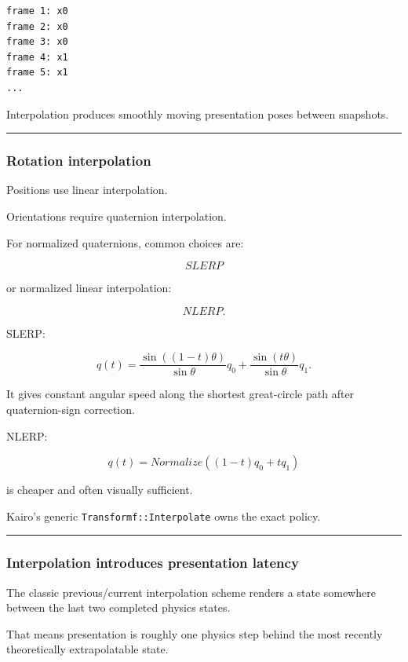 \begin{verbatim}
frame 1: x0
frame 2: x0
frame 3: x0
frame 4: x1
frame 5: x1
...
\end{verbatim}

Interpolation produces smoothly moving presentation poses between snapshots.

\begin{center}\rule{0.5\linewidth}{0.5pt}\end{center}

\subsubsection{Rotation interpolation}\label{rotation-interpolation}

Positions use linear interpolation.

Orientations require quaternion interpolation.

For normalized quaternions, common choices are:

\[
SLERP
\]

or normalized linear interpolation:

\[
NLERP.
\]

SLERP:

\[
q(t)
=
\frac{
\sin((1-t)\theta)
}{
\sin\theta
}q_0
+
\frac{
\sin(t\theta)
}{
\sin\theta
}q_1.
\]

It gives constant angular speed along the shortest great-circle path after quaternion-sign correction.

NLERP:

\[
q(t)
=
Normalize(
(1-t)q_0+tq_1
)
\]

is cheaper and often visually sufficient.

Kairo's generic \texttt{Transformf::Interpolate} owns the exact policy.

\begin{center}\rule{0.5\linewidth}{0.5pt}\end{center}

\subsubsection{Interpolation introduces presentation latency}\label{interpolation-introduces-presentation-latency}

The classic previous/current interpolation scheme renders a state somewhere between the last two completed physics states.

That means presentation is roughly one physics step behind the most recently theoretically extrapolatable state.


